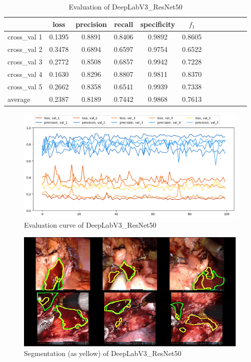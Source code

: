 \documentclass[10pt,journal,compsoc]{IEEEtran}
\begin{document}
\begin{table}[t]
  \begin{tabularx}{\linewidth}{@{}l*{10}{C}c@{}}
    \toprule
      { }             & loss      & precision   & recall  & specificity & {$f_1$} \\ 
    \midrule
      cross\_val 1    & 0.1395    & 0.8891      & 0.8406  & 0.9892      & 0.8605  \\
      cross\_val 2    & 0.3478    & 0.6894      & 0.6597  & 0.9754      & 0.6522  \\
      cross\_val 3    & 0.2772    & 0.8508      & 0.6857  & 0.9942      & 0.7228  \\
      cross\_val 4    & 0.1630    & 0.8296      & 0.8807  & 0.9811      & 0.8370  \\
      cross\_val 5    & 0.2662    & 0.8358      & 0.6541  & 0.9939      & 0.7338  \\
    \addlinespace
      average         & 0.2387    & 0.8189      & 0.7442  & 0.9868      & 0.7613  \\ 
    \bottomrule
  \end{tabularx}
  \caption{Evaluation of DeepLabV3\_ResNet50}
  \label{tab:DeepLabV3ResNet50}
\end{table}

\begin{figure}[h]
  \centering
  \includegraphics[width=\linewidth]{img/trainingCurve_Deeplab.png}
  \caption{Evaluation curve of DeepLabV3\_ResNet50}
  \label{fig:DeepLabTrainingCurve}
\end{figure}

\begin{figure}[t]
  \centering
  \includegraphics[width=\linewidth]{img/Estimation_output_Deeplab_ResNet}
  \caption{Segmentation (as yellow) of DeepLabV3\_ResNet50}
  \label{fig:DeepLabEsti}
\end{figure}
\end{document}
